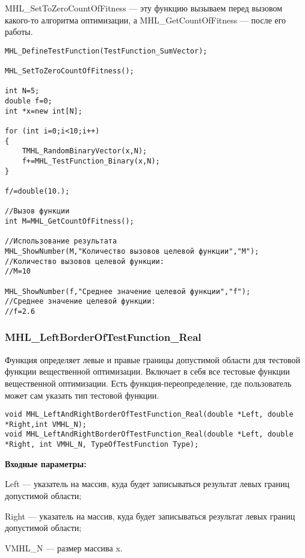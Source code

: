 \documentclass[a4paper,12pt]{article}
\begin{document}
MHL\_SetToZeroCountOfFitness --- эту функцию вызываем перед вызовом какого-то алгоритма оптимизации, а MHL\_GetCountOfFitness --- после его работы.


\begin{lstlisting}[label=code_use_MHL_GetCountOfFitness,caption=Пример использования]
MHL_DefineTestFunction(TestFunction_SumVector);

MHL_SetToZeroCountOfFitness();

int N=5;
double f=0;
int *x=new int[N];

for (int i=0;i<10;i++)
{
    TMHL_RandomBinaryVector(x,N);
    f+=MHL_TestFunction_Binary(x,N);
}

f/=double(10.);

//Вызов функции
int M=MHL_GetCountOfFitness();

//Использование результата
MHL_ShowNumber(M,"Количество вызовов целевой функции","M");
//Количество вызовов целевой функции:
//M=10

MHL_ShowNumber(f,"Среднее значение целевой функции","f");
//Среднее значение целевой функции:
//f=2.6
\end{lstlisting}

\subsubsection{MHL\_LeftBorderOfTestFunction\_Real}\label{MHL_LeftBorderOfTestFunction_Real}

Функция определяет левые и правые границы допустимой области для тестовой функции вещественной оптимизации. Включает в себя все тестовые функции вещественной оптимизации. Есть функция-переопределение, где пользователь может сам указать тип тестовой функции.


\begin{lstlisting}[label=code_syntax_MHL_LeftBorderOfTestFunction_Real,caption=Синтаксис]
void MHL_LeftAndRightBorderOfTestFunction_Real(double *Left, double *Right,int VMHL_N);
void MHL_LeftAndRightBorderOfTestFunction_Real(double *Left, double *Right, int VMHL_N, TypeOfTestFunction Type);
\end{lstlisting}

\textbf{Входные параметры:}

Left --- указатель на массив, куда будет записываться результат левых границ допустимой области;

Right --- указатель на массив, куда будет записываться результат левых границ допустимой области;
	 
VMHL\_N --- размер массива x.
\end{document}

